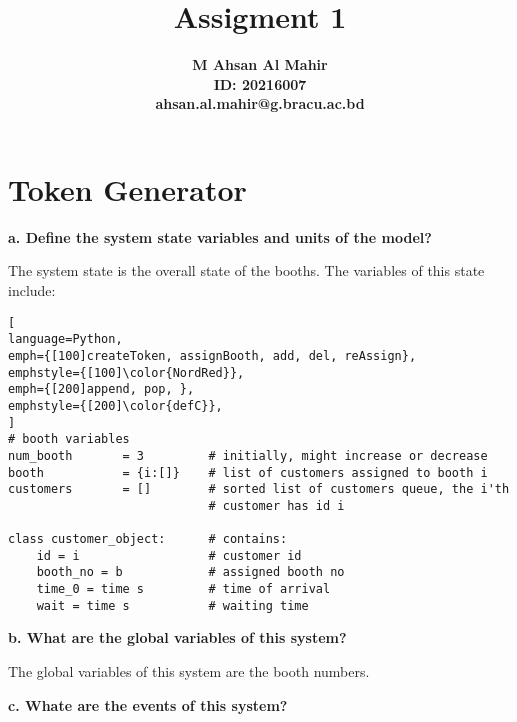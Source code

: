 \documentclass[article, 12pt, a4paper]{memoir}
\title{\bfseries Assigment 1}
\author{\bfseries M Ahsan Al Mahir\\ ID: 20216007\\ ahsan.al.mahir@g.bracu.ac.bd}
\begin{document}
\share \maketitle 

\chapter{Token Generator}

\textbf{a. Define the system state variables and units of the model?}
\vspace{1em}

\begin{solution}
    [a]
    The system state is the overall state of the booths. The variables of this state
    include:
\begin{lstlisting}[
language=Python,
emph={[100]createToken, assignBooth, add, del, reAssign},
emphstyle={[100]\color{NordRed}},
emph={[200]append, pop, },
emphstyle={[200]\color{defC}},
]
# booth variables
num_booth       = 3         # initially, might increase or decrease
booth           = {i:[]}    # list of customers assigned to booth i
customers       = []        # sorted list of customers queue, the i'th
                            # customer has id i

class customer_object:      # contains:
    id = i                  # customer id
    booth_no = b            # assigned booth no
    time_0 = time s         # time of arrival
    wait = time s           # waiting time
\end{lstlisting}
\end{solution}


\textbf{b. What are the global variables of this system?}
\vspace{1em}

\begin{solution}
    [b]
    The global variables of this system are the booth numbers.
\end{solution}

\textbf{c. Whate are the events of this system?}
\vspace{1em}
\end{document}
